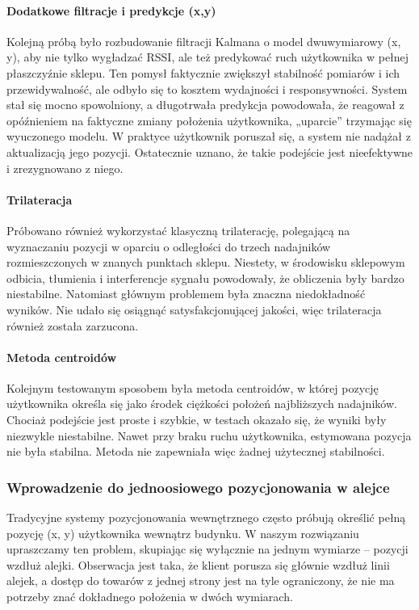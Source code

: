 \paragraph{Dodatkowe filtracje i predykcje (x,y)}
Kolejną próbą było rozbudowanie filtracji Kalmana o model dwuwymiarowy (x, y), aby nie tylko wygładzać RSSI, ale też predykować ruch użytkownika w pełnej płaszczyźnie sklepu. Ten pomysł faktycznie zwiększył stabilność pomiarów i ich przewidywalność, ale odbyło się to kosztem wydajności i responsywności. System stał się mocno spowolniony, a długotrwała predykcja powodowała, że reagował z opóźnieniem na faktyczne zmiany położenia użytkownika, „uparcie” trzymając się wyuczonego modelu. W praktyce użytkownik poruszał się, a system nie nadążał z aktualizacją jego pozycji. Ostatecznie uznano, że takie podejście jest nieefektywne i zrezygnowano z niego.

\paragraph{Trilateracja}
Próbowano również wykorzystać klasyczną trilaterację, polegającą na wyznaczaniu pozycji w oparciu o odległości do trzech nadajników rozmieszczonych w znanych punktach sklepu. Niestety, w środowisku sklepowym odbicia, tłumienia i interferencje sygnału powodowały, że obliczenia były bardzo niestabilne. Natomiast głównym problemem była znaczna niedokładność wyników. Nie udało się osiągnąć satysfakcjonującej jakości, więc trilateracja również została zarzucona.

\paragraph{Metoda centroidów}
Kolejnym testowanym sposobem była metoda centroidów, w której pozycję użytkownika określa się jako środek ciężkości położeń najbliższych nadajników. Chociaż podejście jest proste i szybkie, w testach okazało się, że wyniki były niezwykle niestabilne. Nawet przy braku ruchu użytkownika, estymowana pozycja nie była stabilna. Metoda nie zapewniała więc żadnej użytecznej stabilności.

\subsubsection{Wprowadzenie do jednoosiowego pozycjonowania w alejce}
Tradycyjne systemy pozycjonowania wewnętrznego często próbują określić pełną pozycję (x, y) użytkownika wewnątrz budynku. W naszym rozwiązaniu upraszczamy ten problem, skupiając się wyłącznie na jednym wymiarze – pozycji wzdłuż alejki. Obserwacja jest taka, że klient porusza się głównie wzdłuż linii alejek, a dostęp do towarów z jednej strony jest na tyle ograniczony, że nie ma potrzeby znać dokładnego położenia w dwóch wymiarach.

